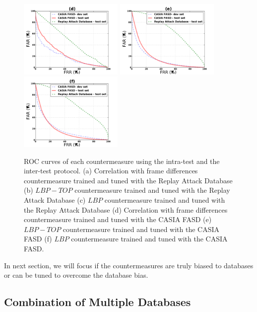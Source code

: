 \begin{figure}[ht]
\begin{center}
\includegraphics [width=5cm] {plots/CROSS-DATABASE/MOTION/roc_casia_fasd-machine.pdf} 
\includegraphics [width=5cm] {plots/CROSS-DATABASE/LBPTOP/roc_casia_fasd-machine.pdf}
\includegraphics [width=5cm] {plots/CROSS-DATABASE/LBP/roc_casia_fasd-machine.pdf}

\caption[ROC curves of each countermeasure using the intra-test and the inter-test protocol]{ROC curves of each countermeasure using the intra-test and the inter-test protocol. (a) Correlation with frame differences countermeasure trained and tuned with the Replay Attack Database (b) $LBP-TOP$ countermeasure trained and tuned with the Replay Attack Database (c) $LBP$ countermeasure trained and tuned with the Replay Attack Database (d) Correlation with frame differences countermeasure trained and tuned with the CASIA FASD (e) $LBP-TOP$ countermeasure trained and tuned with the CASIA FASD (f) $LBP$ countermeasure trained and tuned with the CASIA FASD.} 
\label{fig:ROC_cross}
\end{center}
\end{figure}

In next section, we will focus if the countermeasures are truly biased to databases or can be tuned to overcome the database bias.

\subsection{Combination of Multiple Databases}
\label{sec:combination}

